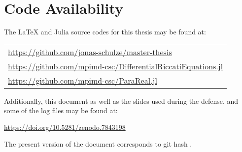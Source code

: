 \section*{Code Availability}

The \LaTeX{} and Julia source codes for this thesis may be found at:
\begin{center}
\begin{tabular}{l}
  \url{https://github.com/jonas-schulze/master-thesis} \\
  \url{https://github.com/mpimd-csc/DifferentialRiccatiEquations.jl} \\
  \url{https://github.com/mpimd-csc/ParaReal.jl}
\end{tabular}
\end{center}
Additionally, this document as well as the slides used during the defense,
and some of the log files may be found at:
\begin{center}
  \url{https://doi.org/10.5281/zenodo.7843198}
\end{center}
The present version of the document corresponds to git hash
\code{}\unskip.
